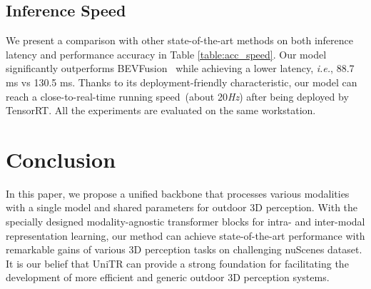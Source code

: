 \documentclass[10pt,twocolumn,letterpaper]{article}
\begin{document}
\begin{table}[t]
\begin{center}
    \centering
\end{center}
\vspace{-8pt}
\caption{The latency and performance on nuScenes val set.}
\label{table:acc_speed}
\vspace{-16pt}
\end{table}
\subsection{Inference Speed}
We present a comparison with other state-of-the-art methods on both inference latency and performance accuracy in Table \ref{table:acc_speed}. Our model significantly outperforms BEVFusion~\cite{liu2022bevfusion} while achieving a lower latency, \emph{i.e.}, 88.7 ms vs 130.5 ms. Thanks to its deployment-friendly characteristic, our model can reach a close-to-real-time running speed~(about 20\textit{Hz}) after being deployed by TensorRT. All the experiments are evaluated on the same workstation. 


\section{Conclusion}
In this paper, we propose a unified backbone that processes various modalities with a single model and shared parameters for outdoor 3D perception. With the specially designed modality-agnostic transformer blocks for intra- and inter-modal representation learning, our method can achieve state-of-the-art performance with remarkable gains of various 3D perception tasks on challenging nuScenes dataset. It is our belief that UniTR can provide a strong foundation for facilitating the development of more efficient and generic outdoor 3D perception systems. 
\end{document}
